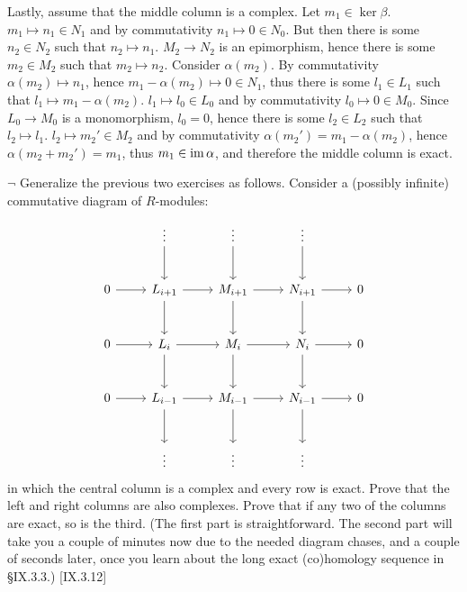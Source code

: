 \begin{solution}
	Lastly, assume that the middle column is a complex. Let $m_1 \in \ker \beta$. $m_1 \mapsto n_1 \in N_1$ and by commutativity $n_1 \mapsto 0 \in N_0$. But then there is some $n_2 \in N_2$ such that $n_2 \mapsto n_1$. $M_2 \to N_2$ is an epimorphism, hence there is some $m_2 \in M_2$ such that $m_2 \mapsto n_2$. Consider $\alpha(m_2)$. By commutativity $\alpha(m_2) \mapsto n_1$, hence $m_1 - \alpha(m_2) \mapsto 0 \in N_1$, thus there is some $l_1 \in L_1$ such that $l_1 \mapsto m_1 - \alpha(m_2)$. $l_1 \mapsto l_0 \in L_0$ and by commutativity $l_0 \mapsto 0 \in M_0$. Since $L_0 \to M_0$ is a monomorphism, $l_0 = 0$, hence there is some $l_2 \in L_2$ such that $l_2 \mapsto l_1$. $l_2 \mapsto m_2' \in M_2$ and by commutativity $\alpha(m_2') = m_1 - \alpha(m_2)$, hence $\alpha(m_2 + m_2') = m_1$, thus $m_1 \in \operatorname{im} \alpha$, and therefore the middle column is exact.
\end{solution}

\begin{problem}
	$\neg$ Generalize the previous two exercises as follows. Consider a (possibly infinite) commutative diagram of $R$-modules:
	\[
		\begin{tikzcd}[row sep=large]
			& \vdots
			\arrow[d]
			& \vdots
			\arrow[d]
			& \vdots
			\arrow[d]
			& \\
			0
			\arrow[r]
			& L_{i+1}
			\arrow[r]
			\arrow[d]
			& M_{i+1}
			\arrow[r]
			\arrow[d]
			& N_{i+1}
			\arrow[r]
			\arrow[d]
			& 0 \\
			0
			\arrow[r]
			& L_i
			\arrow[r]
			\arrow[d]
			& M_i
			\arrow[r]
			\arrow[d]
			& N_i
			\arrow[r]
			\arrow[d]
			& 0 \\
			0
			\arrow[r]
			& L_{i-1}
			\arrow[r]
			\arrow[d]
			& M_{i-1}
			\arrow[r]
			\arrow[d]
			& N_{i-1}
			\arrow[r]
			\arrow[d]
			& 0 \\
			& \vdots
			& \vdots
			& \vdots
		\end{tikzcd}
	\]
	in which the central column is a complex and every row is exact. Prove that the left and right columns are also complexes. Prove that if any two of the columns are exact, so is the third. (The first part is straightforward. The second part will take you a couple of minutes now due to the needed diagram chases, and a couple of seconds later, once you learn about the long exact (co)homology sequence in \S IX.3.3.) [IX.3.12]
\end{problem}

